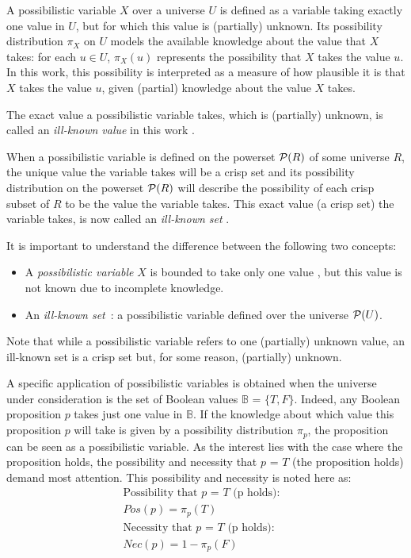 \begin{definition}
\label{def;possibilistic-variable}
A possibilistic variable $X$ over a universe $U$ is defined as a variable taking exactly one value in $U$, but for which this value is (partially) unknown. Its possibility distribution $\pi_X$ on $U$ models the available knowledge about the value that $X$ takes: for each $u\in U$, $\pi_X(u)$ represents the possibility that $X$ takes the value $u$. In this work, this possibility is interpreted as a measure of how plausible it is that $X$ takes the value $u$, given (partial) knowledge about the value $X$ takes.
\end{definition}

The exact value a possibilistic variable takes, which is (partially) unknown, is called an \emph{ill-known value} in this work \cite{Dubois1988a}.

When a possibilistic variable is defined on the powerset $\mathcal{P}(R)$ of some universe $R$, the unique value the variable takes will be a crisp set and its possibility distribution on the powerset $\mathcal{P}(R)$ will describe the possibility of each crisp subset of $R$ to be the value the variable takes. This exact value (a crisp set) the variable takes, is now called an \emph{ill-known set} \cite{Dubois1988a}.

It is important to understand the difference between the following two concepts:
\begin{itemize}
\item
A \emph{possibilistic variable} $X$ is bounded to take only one value , but this value is not known due to incomplete knowledge. 
\item
An \emph{ill-known set}~\cite{Dubois1988a}: a possibilistic variable defined over the universe $\mathcal{P}(U)$.
\end{itemize}

Note that while a possibilistic variable refers to one (partially) unknown value, an ill-known set is a crisp set but, for some reason, (partially) unknown.

A specific application of possibilistic variables is obtained when the universe under consideration is the set of Boolean values $\mathbb{B}$ = $\{T,F\}$. Indeed, any Boolean proposition $p$ takes just one value in $\mathbb{B}$. If the knowledge about which value this proposition $p$ will take is given by a possibility distribution $\pi_p$, the proposition can be seen as a possibilistic variable. As the interest lies with the case where the proposition holds, the possibility and necessity that $p$ = $T$ (the proposition holds) demand most attention. This possibility and necessity is noted here as:
\begin{align}
\text{Possibility that $p$ = $T$ (p holds):} &\\
\nonumber
Pos(p) = \pi_p(T) \label{propholdsposs} \\
\text{Necessity that $p$ = $T$ (p holds):} & \\
\nonumber
Nec(p) = 1-\pi_p(F) \label{propholdsnecc}
\end{align}

